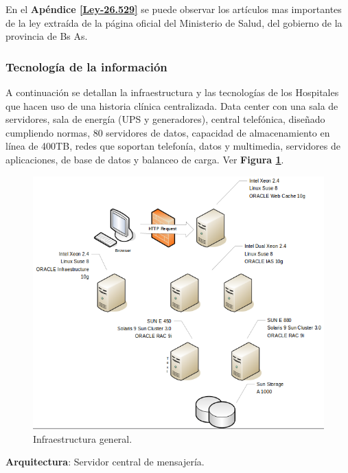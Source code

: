En el \textbf{Apéndice \ref{Ley-26.529}} se puede observar los artículos mas importantes de la ley extraída de la página oficial del Ministerio de Salud, del gobierno de la provincia de Bs As.




\subsubsection{Tecnología de la información}
 A continuación se detallan la infraestructura y las tecnologías de los Hospitales que hacen uso de una historia clínica centralizada.
 Data center con una sala de servidores, sala de energía (UPS y generadores), central telefónica, diseñado cumpliendo normas, 80 servidores de datos, capacidad de almacenamiento en línea de 400TB, redes que soportan telefonía, datos y multimedia, servidores de aplicaciones, de base de datos y balanceo de carga.
 Ver \textbf{Figura \ref{infgen}}.
 
\begin{figure}
  \centering
  \includegraphics[width=.8\textwidth]{img/tp1/modeloGrande}
  \caption{Infraestructura general.}
  \label{infgen}
\end{figure}

    \textbf{Arquitectura}: Servidor central de mensajería.
    
